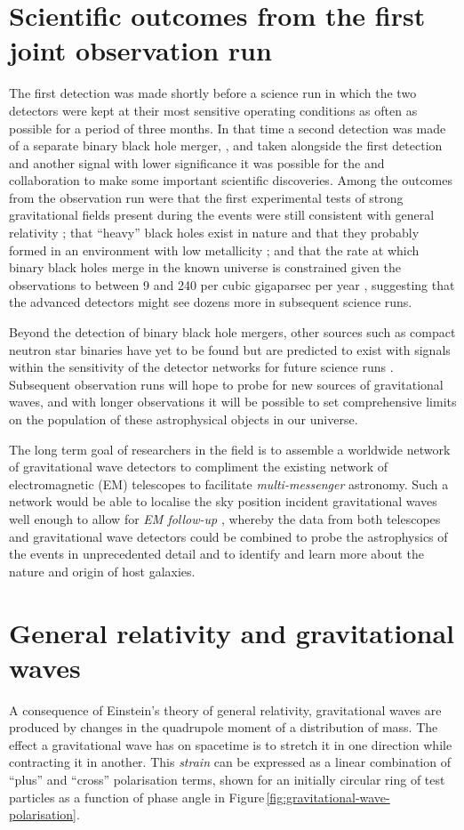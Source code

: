 \section{Scientific outcomes from the first joint observation run}
The first detection was made shortly before a science run in which the two \LIGO{} detectors were kept at their most sensitive operating conditions as often as possible for a period of three months. In that time a second detection was made of a separate binary black hole merger, \GWSECONDEVENT{} \cite{Abbott2016b}, and taken alongside the first detection and another signal with lower significance it was possible for the \LSC{} and \VIRGO{} collaboration to make some important scientific discoveries. Among the outcomes from the observation run were that the first experimental tests of strong gravitational fields present during the events were still consistent with general relativity \cite{Abbott2016c}; that ``heavy'' black holes exist in nature and that they probably formed in an environment with low metallicity \cite{Abbott2016d}; and that the rate at which binary black holes merge in the known universe is constrained given the observations to between 9 and 240 per cubic gigaparsec per year \cite{lscvirgoo1}, suggesting that the advanced detectors might see dozens more in subsequent science runs.

Beyond the detection of binary black hole mergers, other sources such as compact neutron star binaries have yet to be found but are predicted to exist with signals within the sensitivity of the detector networks for future science runs \cite{Abbott2016f}. Subsequent observation runs will hope to probe for new sources of gravitational waves, and with longer observations it will be possible to set comprehensive limits on the population of these astrophysical objects in our universe.

The long term goal of researchers in the field is to assemble a worldwide network of gravitational wave detectors to compliment the existing network of electromagnetic (\gls{EM}) telescopes to facilitate \emph{multi-messenger} astronomy. Such a network would be able to localise the sky position incident gravitational waves well enough to allow for \emph{\gls{EM} follow-up} \cite{Abbott2016e, Abbott2016f}, whereby the data from both telescopes and gravitational wave detectors could be combined to probe the astrophysics of the events in unprecedented detail and to identify and learn more about the nature and origin of host galaxies.

\section{General relativity and gravitational waves}
A consequence of Einstein's theory of general relativity, gravitational waves are produced by changes in the quadrupole moment of a distribution of mass. The effect a gravitational wave has on spacetime is to stretch it in one direction while contracting it in another. This \emph{strain} can be expressed as a linear combination of ``plus'' and ``cross'' polarisation terms, shown for an initially circular ring of test particles as a function of phase angle in Figure\,\ref{fig:gravitational-wave-polarisation}.

